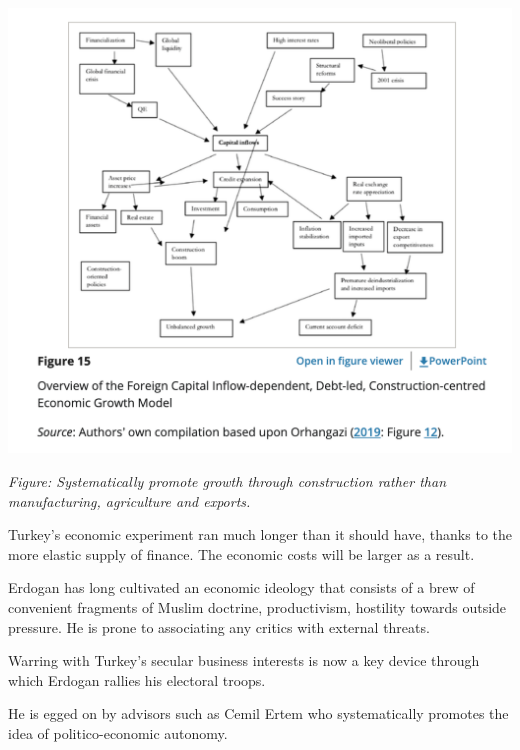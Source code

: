 \documentclass[
]{book}
\begin{document}
\includegraphics{fig/turkey_model.png}

\emph{Figure: Systematically promote growth through construction rather than manufacturing, agriculture and exports.}

Turkey's economic experiment ran much longer than it should have, thanks to the more elastic supply of finance. The economic costs will be larger as a result.

Erdogan has long cultivated an economic ideology that consists of a brew of convenient fragments of Muslim doctrine, productivism, hostility towards outside pressure. He is prone to associating any critics with external threats.

Warring with Turkey's secular business interests is now a key device through which Erdogan rallies his electoral troops.

He is egged on by advisors such as Cemil Ertem who systematically promotes the idea of politico-economic autonomy.
\end{document}
